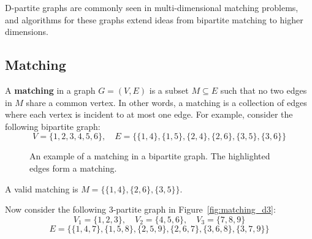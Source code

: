 D-partite graphs are commonly seen in multi-dimensional matching problems, and algorithms for these graphs extend ideas from bipartite matching to higher dimensions.

\subsection{Matching}
A \textbf{matching} in a graph \( G = (V, E) \) is a subset \( M \subseteq E \) such that no two edges in \( M \) share a common vertex. In other words, a matching is a collection of edges where each vertex is incident to at most one edge.\cite{yadav2023advanced} For example, consider the following bipartite graph:
\[
V = \{1, 2, 3, 4, 5, 6\}, \quad E = \{\{1, 4\}, \{1, 5\}, \{2, 4\}, \{2, 6\}, \{3, 5\}, \{3, 6\}\}
\]

\begin{figure}[h]
\begin{center}
\caption{An example of a matching in a bipartite graph. The highlighted edges form a matching.}
\label{fig:matching}
\end{center}
\end{figure}

A valid matching is \( M = \{\{1, 4\}, \{2, 6\}, \{3, 5\}\} \).

Now consider the following 3-partite graph in Figure~\ref{fig:matching_d3}:
\[
V_1 = \{1, 2, 3\}, \quad V_2 = \{4, 5, 6\}, \quad V_3 = \{7, 8, 9\}
\]
\[
E = \{\{1, 4, 7\}, \{1, 5, 8\}, \{2, 5, 9\}, \{2, 6, 7\}, \{3, 6, 8\}, \{3, 7, 9\}\}
\]

